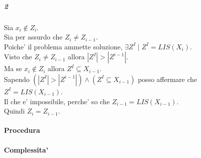 \subparagraph{2}

Sia $x_i \notin Z_i$. \\
Sia per assurdo che $Z_i \ne Z_{i-1}$. \\
Poiche' il problema ammette soluzione, $\exists Z^I \mid Z^I = LIS(X_i)$. \\
Visto che $Z_i \ne Z_{i-1}$ allora $|Z^I| > |Z^{i-1}|$. \\
Ma se $x_i \notin Z_i$ allora $Z^{I} \subseteq X_{i-1}$. \\
Sapendo $(|Z^I| > |Z^{i-1}|) \land (Z^{I} \subseteq X_{i-1})$ posso affermare che $Z^{I} = LIS(X_{i-1})$. \\
Il che e' impossibile, perche' so che $Z_{i-1} = LIS(X_{i-1})$. \\
Quindi $Z_i = Z_{i-1}$.

\paragraph{Procedura}

\paragraph{Complessita'}
